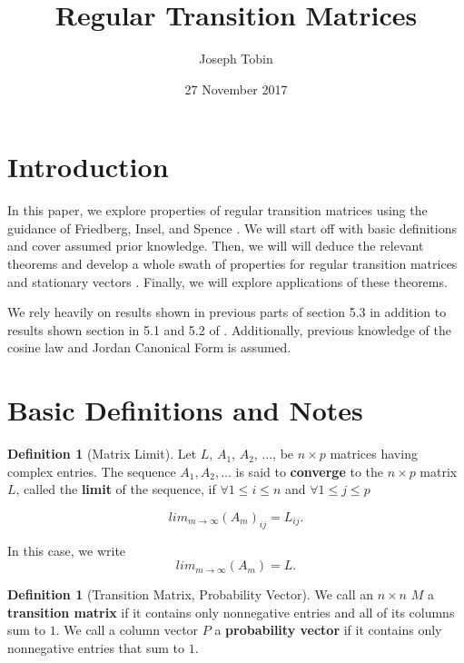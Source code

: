 \documentclass{amsart}
\title{Regular Transition Matrices}
\author{Joseph Tobin}
\date{27 November 2017}
\theoremstyle{definition}
\newtheorem{definition}[thm]{Definition}
\theoremstyle{remark}
\numberwithin{equation}{section}
\begin{document}
\maketitle





\section{Introduction}
In this paper, we explore properties of regular transition matrices using the guidance of Friedberg, Insel, and Spence \cite{friedberg2003linear}.
We will start off with basic definitions and cover assumed prior knowledge.
Then, we will will deduce the relevant theorems and develop a whole swath of properties for regular transition matrices and stationary vectors .
Finally, we will explore applications of these theorems.


We rely heavily on results shown in previous parts of section 5.3 in addition to results shown section in 5.1 and 5.2 of \cite{friedberg2003linear}.
Additionally, previous knowledge of the cosine law and Jordan Canonical Form is assumed.

\section{Basic Definitions and Notes}

\begin{definition}[Matrix Limit]
Let $L$, $A_1$, $A_2$, $\ldots$, be $n \times p$ matrices having complex entries.
The sequence $A_1, A_2, \ldots$ is said to \textbf{converge} to the $n \times p$ matrix $L$, called the \textbf{limit} of the sequence, if $\forall 1 \leq i \leq n$ and $\forall 1 \leq j \leq p$

$$lim_{m \to \infty}(A_m)_{ij} = L_{ij}.$$

In this case, we write $$ lim_{m \to \infty}(A_m) = L.$$


\end{definition}


\begin{definition}[Transition Matrix, Probability Vector]
We call an $n \times n$ $M$ a \textbf{transition matrix} if it contains only nonnegative entries and all of its columns sum to $1$.
We call a column vector $P$ a \textbf{probability vector} if it contains only nonnegative entries that sum to $1$.
\end{definition}
\end{document}
